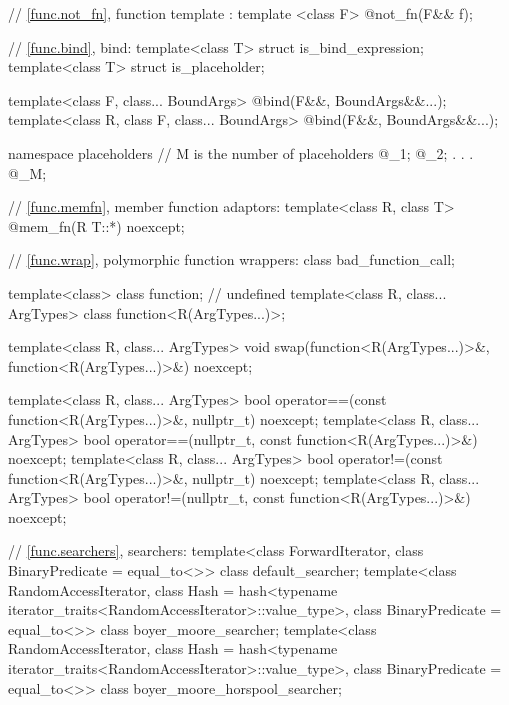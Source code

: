 \begin{codeblock}
{  // \ref{func.not_fn}, function template :
  template <class F> @\unspec@ not_fn(F&& f);

  // \ref{func.bind}, bind:
  template<class T> struct is_bind_expression;
  template<class T> struct is_placeholder;

  template<class F, class... BoundArgs>
    @\unspec@ bind(F&&, BoundArgs&&...);
  template<class R, class F, class... BoundArgs>
    @\unspec@ bind(F&&, BoundArgs&&...);

  namespace placeholders {
    // M is the  number of placeholders
    @\seebelow@ _1;
    @\seebelow@ _2;
                .
                .
                .
    @\seebelow@ _M;
  }

  // \ref{func.memfn}, member function adaptors:
  template<class R, class T> @\unspec@ mem_fn(R T::*) noexcept;

  // \ref{func.wrap}, polymorphic function wrappers:
  class bad_function_call;

  template<class> class function; // undefined
  template<class R, class... ArgTypes> class function<R(ArgTypes...)>;

  template<class R, class... ArgTypes>
    void swap(function<R(ArgTypes...)>&, function<R(ArgTypes...)>&) noexcept;

  template<class R, class... ArgTypes>
    bool operator==(const function<R(ArgTypes...)>&, nullptr_t) noexcept;
  template<class R, class... ArgTypes>
    bool operator==(nullptr_t, const function<R(ArgTypes...)>&) noexcept;
  template<class R, class... ArgTypes>
    bool operator!=(const function<R(ArgTypes...)>&, nullptr_t) noexcept;
  template<class R, class... ArgTypes>
    bool operator!=(nullptr_t, const function<R(ArgTypes...)>&) noexcept;

  // \ref{func.searchers}, searchers:
  template<class ForwardIterator, class BinaryPredicate = equal_to<>>
    class default_searcher;
  template<class RandomAccessIterator,
           class Hash = hash<typename iterator_traits<RandomAccessIterator>::value_type>,
           class BinaryPredicate = equal_to<>>
    class boyer_moore_searcher;
  template<class RandomAccessIterator,
           class Hash = hash<typename iterator_traits<RandomAccessIterator>::value_type>,
           class BinaryPredicate = equal_to<>>
    class boyer_moore_horspool_searcher;

}
\end{codeblock}
